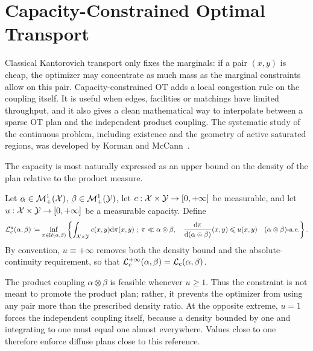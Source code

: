 \section{Capacity-Constrained Optimal Transport}
\label{sec-capacity-constrained-ot}

Classical Kantorovich transport only fixes the marginals: if a pair $(x,y)$ is cheap, the optimizer may concentrate as much mass as the marginal constraints allow on this pair. Capacity-constrained OT adds a local congestion rule on the coupling itself. It is useful when edges, facilities or matchings have limited throughput, and it also gives a clean mathematical way to interpolate between a sparse OT plan and the independent product coupling. The systematic study of the continuous problem, including existence and the geometry of active saturated regions, was developed by Korman and McCann~\cite{km1}.

The capacity is most naturally expressed as an upper bound on the density of the plan relative to the product measure.
\begin{defn}\label{def-capacity-constrained-ot}
Let $\alpha\in\mathcal{M}_+^1(\mathcal{X})$, $\beta\in\mathcal{M}_+^1(\mathcal{Y})$, let $c:\mathcal{X}\times\mathcal{Y}\to[0,+\infty]$ be measurable, and let $u:\mathcal{X}\times\mathcal{Y}\to[0,+\infty]$ be a measurable capacity. Define
\begin{equation}\label{eq-capacity-constrained-ot}
	\mathcal{L}_c^u(\alpha,\beta)
	\coloneqq
	\inf_{\pi\in\mathcal{U}(\alpha,\beta)}
	\left\{ 
		\int_{\mathcal{X}\times\mathcal{Y}} c(x,y)\mathrm{d}\pi(x,y)
	 \;;\; 
		\pi\ll\alpha\otimes\beta,\quad
		\frac{\mathrm{d}\pi}{\mathrm{d}(\alpha\otimes\beta)}(x,y)\leqslant u(x,y)
		\quad (\alpha\otimes\beta)\text{-a.e.}
	 \right\}.
\end{equation}
By convention, $u\equiv+\infty$ removes both the density bound and the absolute-continuity requirement, so that $\mathcal{L}_c^{+\infty}(\alpha,\beta)=\mathcal{L}_c(\alpha,\beta)$.
\end{defn}
The product coupling $\alpha\otimes\beta$ is feasible whenever $u\geq1$. Thus the constraint is not meant to promote the product plan; rather, it prevents the optimizer from using any pair more than the prescribed density ratio. At the opposite extreme, $u=1$ forces the independent coupling itself, because a density bounded by one and integrating to one must equal one almost everywhere. Values close to one therefore enforce diffuse plans close to this reference.

